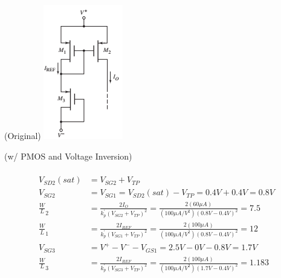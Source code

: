 \documentclass[12pt,letterpaper,titlepage]{article}
\begin{document}
\begin{raggedright}
\begin{center}
\begin{paracol}{2}
(Original)
\switchcolumn
\centering
\includegraphics[width=\textwidth, height=12\baselineskip, keepaspectratio=true]{ds1a}

(w/ PMOS and Voltage Inversion)
\end{paracol}
\end{center}

\begin{align*}
\\ V_{SD2}(sat) 
	&= V_{SG2} + V_{TP}
\\ V_{SG2}
	&= V_{SG1}
	 = V_{SD2}(sat) - V_{TP}
	 = 0.4V + 0.4V
	 = 0.8V
\\ \frac{W}{L}_2 
	&= \frac{2I_O}{k_p^\prime(V_{SG2}+V_{TP})^2}
	 = \frac{2(60\mu A)}{(100\mu A/V^2)(0.8V-0.4V)^2}
	 = 7.5
\\ \frac{W}{L}_1 
	&= \frac{2I_{REF}}{k_p^\prime(V_{SG1}+V_{TP})^2}
	 = \frac{2(100\mu A)}{(100\mu A/V^2)(0.8V-0.4V)^2}
	 = 12
\\ V_{SG3}
	&= V^+ - V^- - V_{GS1}
	 = 2.5V - 0V - 0.8V
	 = 1.7V
\\ \frac{W}{L}_3 
	&= \frac{2I_{REF}}{k_p^\prime(V_{SG3}+V_{TP})^2}
	 = \frac{2(100\mu A)}{(100\mu A/V^2)(1.7V-0.4V)^2}
	 = 1.183
\end{align*}


\end{raggedright}
\end{document}
